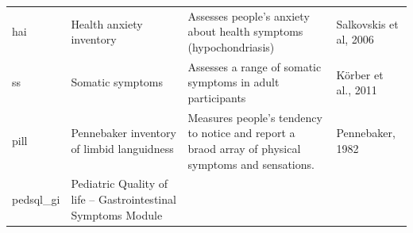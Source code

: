 \documentclass[]{book}
\begin{document}
\begin{longtable}[]{@{}llll@{}}
\begin{minipage}[t]{0.22\columnwidth}
hai\strut
\end{minipage} & \begin{minipage}[t]{0.27\columnwidth}\raggedright
Health anxiety inventory\strut
\end{minipage} & \begin{minipage}[t]{0.22\columnwidth}\raggedright
Assesses people's anxiety about health symptoms (hypochondriasis)\strut
\end{minipage} & \begin{minipage}[t]{0.18\columnwidth}\raggedright
Salkovskis et al, 2006\strut
\end{minipage}\tabularnewline
\begin{minipage}[t]{0.22\columnwidth}\raggedright
ss\strut
\end{minipage} & \begin{minipage}[t]{0.27\columnwidth}\raggedright
Somatic symptoms\strut
\end{minipage} & \begin{minipage}[t]{0.22\columnwidth}\raggedright
Assesses a range of somatic symptoms in adult participants\strut
\end{minipage} & \begin{minipage}[t]{0.18\columnwidth}\raggedright
Körber et al., 2011\strut
\end{minipage}\tabularnewline
\begin{minipage}[t]{0.22\columnwidth}\raggedright
pill\strut
\end{minipage} & \begin{minipage}[t]{0.27\columnwidth}\raggedright
Pennebaker inventory of limbid languidness\strut
\end{minipage} & \begin{minipage}[t]{0.22\columnwidth}\raggedright
Measures people's tendency to notice and report a braod array of physical symptoms and sensations.\strut
\end{minipage} & \begin{minipage}[t]{0.18\columnwidth}\raggedright
Pennebaker, 1982\strut
\end{minipage}\tabularnewline
\begin{minipage}[t]{0.22\columnwidth}\raggedright
pedsql\_gi\strut
\end{minipage} & \begin{minipage}[t]{0.27\columnwidth}\raggedright
Pediatric Quality of life -- Gastrointestinal Symptoms Module\strut
\end{minipage} & \begin{minipage}[t]{0.22\columnwidth}\raggedright

\end{minipage}
\end{longtable}
\end{document}
